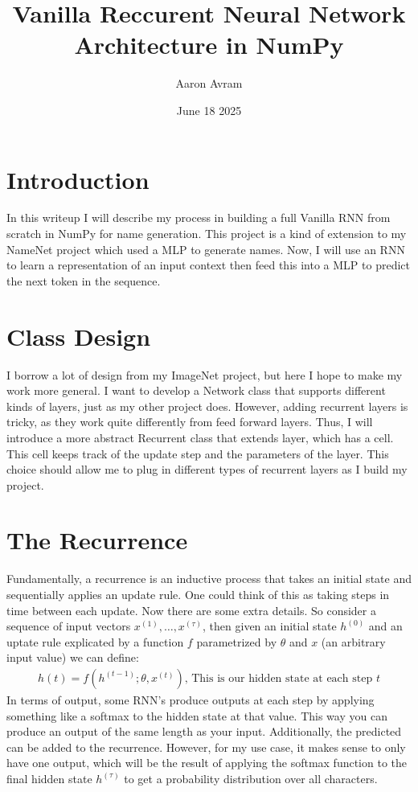 \documentclass[12pt]{article}
\title{Vanilla Reccurent Neural Network Architecture in NumPy}
\author{Aaron Avram}
\date{June 18 2025}
\begin{document}
\maketitle

\section*{Introduction}
In this writeup I will describe my process in building a full Vanilla RNN from scratch in NumPy for name generation. This project
is a kind of extension to my NameNet project which used a MLP to generate names. Now, I will use an RNN to learn a representation of an input context
then feed this into a MLP to predict the next token in the sequence.

\section*{Class Design}
I borrow a lot of design from my ImageNet project, but here I hope to make my work more general. I want to develop a Network class that supports different
kinds of layers, just as my other project does. However, adding recurrent layers is tricky, as they work quite differently from feed forward layers. Thus, I will
introduce a more abstract Recurrent class that extends layer, which has a cell. This cell keeps track of the update step and the parameters of the layer. This choice
should allow me to plug in different types of recurrent layers as I build my project.

\section*{The Recurrence}
Fundamentally, a recurrence is an inductive process that takes an initial state and sequentially applies an update rule. One could think of this
as taking steps in time between each update. Now there are some extra details. So consider a sequence of input vectors $x^{(1)}, \dots, x^{(\tau)}$,
then given an initial state $h^{(0)}$ and an uptate rule explicated by a function $f$ parametrized by $\theta$ and $x$ (an arbitrary input value)
we can define:
\begin{align*}
    h{(t)} = f(h^{(t-1)}; \theta, x^{(t)})\text{, This is our hidden state at each step $t$}
\end{align*}
In terms of output, some RNN's produce outputs at each step by applying something like a softmax to the hidden state at that value. This way you can produce
an output of the same length as your input. Additionally, the predicted can be added to the recurrence. However, for my use case, it makes sense to only
have one output, which will be the result of applying the softmax function to the final hidden state $h^{(\tau)}$ to get a probability distribution over all characters.
\end{document}
